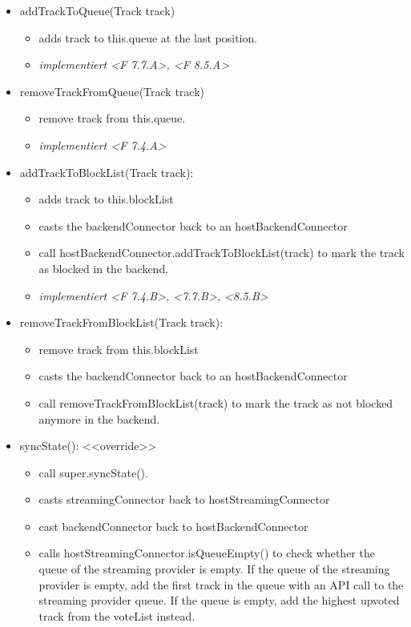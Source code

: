 \documentclass[oneside, ngerman]{sdqtechreport}
\begin{document}
\begin{itemize}
    \item addTrackToQueue(Track track)
    \begin{itemize}
        \item adds track to this.queue at the last position.
        \item \textit{implementiert <F 7.7.A>, <F 8.5.A>}
    \end{itemize}
    \item removeTrackFromQueue(Track track)
    \begin{itemize}
        \item remove track from this.queue.
        \item \textit{implementiert <F 7.4.A>}
    \end{itemize}
    \item addTrackToBlockList(Track track):
    \begin{itemize}
        \item adds track to this.blockList
        \item casts the backendConnector back to an hostBackendConnector
        \item call hostBackendConnector.addTrackToBlockList(track) to mark the track as blocked in the backend.
        \item \textit{implementiert <F 7.4.B>, <7.7.B>, <8.5.B>}
    \end{itemize}
    \item removeTrackFromBlockList(Track track):
    \begin{itemize}
        \item remove track from this.blockList
        \item casts the backendConnector back to an hostBackendConnector
        \item call removeTrackFromBlockList(track) to mark the track as not blocked anymore in the backend.
    \end{itemize}
    \item syncState(): <<override>>
    \begin{itemize}
        \item call super.syncState().
        \item casts streamingConnector back to hostStreamingConnector
        \item cast backendConnector back to hostBackendConnector
        \item calls hostStreamingConnector.isQueueEmpty() to check whether the queue of the streaming provider is empty. If the queue of the streaming provider is empty, add the first track in the queue with an API call to the streaming provider queue. If the queue is empty,  add the highest upvoted track from the voteList instead.

\end{itemize}
\end{itemize}
\end{document}
